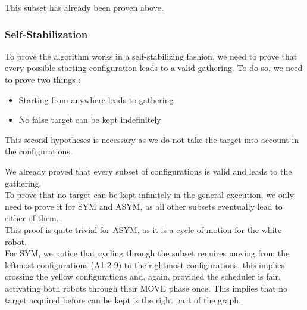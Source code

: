 \documentclass[11pt]{article}
\begin{document}
This subset has already been proven above.

\subsubsection{Self-Stabilization}

To prove the algorithm works in a self-stabilizing fashion, we need to prove that every possible starting configuration leads to a valid gathering. To do so, we need to prove two things : 

\begin{itemize}
\item Starting from anywhere leads to gathering
\item No false target can be kept indefinitely
\end{itemize}

This second hypotheses is necessary as we do not take the target into account in the configurations.

We already proved that every subset of configurations is valid and leads to the gathering. 
\\
To prove that no target can be kept infinitely in the general execution, we only need to prove it for SYM and ASYM, as all other subsets eventually lead to either of them.
\\
This proof is quite trivial for ASYM, as it is a cycle of motion for the white robot.
\\
For SYM, we notice that cycling through the subset requires moving from the leftmost configurations (A1-2-9) to the rightmost configurations. this implies crossing the yellow configurations and, again, provided the scheduler is fair, activating both robots through their MOVE phase once. This implies that no target acquired before can be kept is the right part of the graph.
\end{document}
